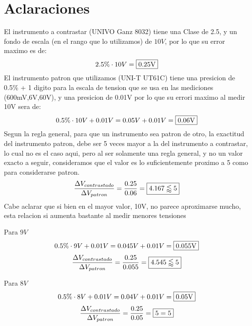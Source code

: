 \section{Aclaraciones}
El instrumento a contrastar (UNIVO Ganz 8032) tiene una Clase de 2.5, y un fondo de escala (en el rango que lo utilizamos) de $10V$, por lo que su error maximo es de:
$$2.5\% \cdot 10V = \framebox{0.25V}$$
El instrumento patron que utilizamos (UNI-T UT61C) tiene una presicion de 0.5\% + 1 digito para la escala de tension que se usa en las mediciones (600mV,6V,60V), y una presicion de 0.01V por lo que su errori maximo al medir 10V sera de:
$$0.5\% \cdot 10V + 0.01V = 0.05V + 0.01V = \framebox{0.06V}$$
Segun la regla general, para que un instrumento sea patron de otro, la exactitud del instrumento patron, debe ser 5 veces mayor a la del instrumento a contrastar, lo cual no es el caso aqui, pero al ser solamente una regla
general, y no un valor exacto a seguir, consideramos que el valor es lo suficientemente proximo a 5 como para considerarse patron.
$$\dfrac{\Delta V_{contrastado}}{\Delta V_{patron}} = \dfrac{0.25}{0.06} = \framebox{$4.167 \lessapprox 5$}$$
Cabe aclarar que si bien en el mayor valor, 10V, no parece aproximarse mucho, esta relacion si aumenta bastante al medir menores tensiones

Para $9V$
$$0.5\% \cdot 9V + 0.01V = 0.045V + 0.01V = \framebox{0.055V}$$
$$\dfrac{\Delta V_{contrastado}}{\Delta V_{patron}} = \dfrac{0.25}{0.055} = \framebox{$4.545 \lessapprox 5$}$$

Para $8V$
$$0.5\% \cdot 8V + 0.01V = 0.04V + 0.01V = \framebox{0.05V}$$
$$\dfrac{\Delta V_{contrastado}}{\Delta V_{patron}} = \dfrac{0.25}{0.05} = \framebox{$5 = 5$}$$
